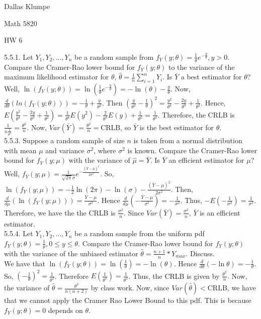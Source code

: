 \documentclass[12pt]{article}
\begin{document}
\noindent Dallas Klumpe

\noindent Math 5820

\noindent HW 6

5.5.1. Let $Y_1,Y_2,\ldots,Y_n$ be a random sample from $f_Y(y;\theta)=\frac{1}{\theta}e^{-\frac{y}{\theta}}, y>0$. Compare the Cramer-Rao lower bound for $f_Y(y;\theta)$ to the variance of the maximum likelihood estimator for $\theta$, $\hat{\theta}=\frac1n\sum_{i=1}^nY_i$. Is $\bar{Y}$ a best estimator for $\theta$?\\
Well, $\ln(f_Y(y;\theta))=\ln(\frac{1}{\theta}e^{-\frac{y}{\theta}})=-\ln(\theta)-\frac{y}{\theta}$. Now, $\frac{d}{d\theta}(ln(f_Y(y;\theta)))=-\frac{1}{\theta}+\frac{y}{\theta^2}$. Then $(\frac{y}{\theta^2}-\frac{1}{\theta})^2=\frac{y^2}{\theta^4}-\frac{2y}{\theta^3}+\frac{1}{\theta^2}$. Hence, $E(\frac{y^2}{\theta^4}-\frac{2y}{\theta^3}+\frac{1}{\theta^2})=\frac{1}{\theta^4}E(y^2)-\frac{2}{\theta^3}E(y)+\frac{1}{\theta^2}=\frac{1}{\theta^2}$. Therefore, the CRLB is $\frac{1}{n\frac{1}{\theta^2}}=\frac{\theta^2}{n}$. Now, $Var(\bar{Y})=\frac{\theta^2}{n}=$CRLB, so $\bar{Y}$ is the best estimator for $\theta$.\\[20pt]

5.5.3. Suppose a random sample of size $n$ is taken from a normal distribution with mean $\mu$ and variance $\sigma^2$, where $\sigma^2$ is known. Compare the Cramer-Rao lower bound for $f_Y(y;\mu)$ with the variance of $\hat{\mu}=\bar{Y}$. Is $\bar{Y}$ an efficient estimator for $\mu$?\\
Well, $f_Y(y;\mu)=\frac{1}{\sqrt{2\pi}\sigma}e^{-\frac{(\bar{Y}-\mu)^2}{2\sigma^2}}$. So, $\ln(f_Y(y;\mu))=-\frac12\ln(2\pi)-\ln(\sigma)-\frac{(\bar{Y}-\mu)^2}{2\sigma^2}$. Then, $\frac{d}{d\mu}(\ln(f_Y(y;\mu)))=\frac{\bar{Y}-\mu}{\sigma^2}$. Hence $\frac{d}{d\mu}(-\frac{\bar{Y}-\mu}{\sigma^2})=-\frac{1}{\sigma^2}$. Thus, $-E(-\frac{1}{\sigma^2})=\frac{1}{\sigma^2}$. Therefore, we have the the CRLB is $\frac{\sigma^2}{n}$. Since $Var(\bar{Y})=\frac{\sigma^2}{n}$, $\bar{Y}$ is an efficient estimator.\\[20pt]

5.5.4. Let $Y_1,Y_2,\ldots,Y_n$ be a random sample from the uniform pdf $f_Y(y;\theta)=\frac{1}{\theta}, 0\leq y\leq\theta$. Compare the Cramer-Rao lower bound for $f_Y(y;\theta)$ with the variance of the unbiased estimator $\hat{\theta}=\frac{n+1}{n}*Y_{max}$. Discuss.\\
We have that $\ln(f_Y(y;\theta))=\ln(\frac{1}{\theta})=-\ln(\theta)$. Hence $\frac{d}{d\theta}(-\ln{\theta})=-\frac{1}{\theta}$. So, $(-\frac{1}{\theta})^2=\frac{1}{\theta^2}$. Therefore $E(\frac{1}{\theta^2})=\frac{1}{\theta^2}$. Thus, the CRLB is given by $\frac{\theta^2}{n}.$ Now, the variance of $\hat{\theta}=\frac{\theta^2}{n(n+2)}$ by class work. Now, since $Var(\hat{\theta})<$CRLB, we have that we cannot apply the Cramer Rao Lower Bound to this pdf. This is because $f_Y(y;\theta)=0$ depends on $\theta$.
\end{document}

